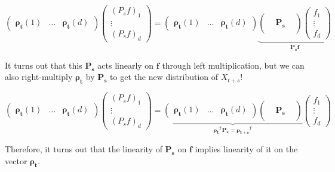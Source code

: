 \documentclass{article}
\begin{document}
\begin{example}
      \[\begin{pmatrix} \boldsymbol{\rho_t} (1) & \ldots & \boldsymbol{\rho_t} (d) \end{pmatrix} \begin{pmatrix} (P_s f)_1 \\ \vdots \\(P_s f)_d \end{pmatrix} = \begin{pmatrix} \boldsymbol{\rho_t} (1) & \ldots & \boldsymbol{\rho_t} (d) \end{pmatrix} \underbrace{\begin{pmatrix} && \\ & \mathbf{P_s} & \\ && \end{pmatrix} \begin{pmatrix} f_1 \\ \vdots \\ f_d \end{pmatrix}}_{\mathbf{P_s f}}\]

    It turns out that this $\mathbf{P_s}$ acts linearly on $\mathbf{f}$ through left multiplication, but we can also right-multiply $\boldsymbol{\rho_t}$ by $\mathbf{P_s}$ to get the new distribution of $X_{t + s}$! 

      \[\begin{pmatrix} \boldsymbol{\rho_t} (1) & \ldots & \boldsymbol{\rho_t} (d) \end{pmatrix} \begin{pmatrix} (P_s f)_1 \\ \vdots \\(P_s f)_d \end{pmatrix} = \underbrace{\begin{pmatrix} \boldsymbol{\rho_t} (1) & \ldots & \boldsymbol{\rho_t} (d) \end{pmatrix} \begin{pmatrix} && \\ & \mathbf{P_s} & \\ && \end{pmatrix}}_{\boldsymbol{\rho_t}^T \mathbf{P_s} = \boldsymbol{\rho_{t+s}}^T} \begin{pmatrix} f_1 \\ \vdots \\ f_d \end{pmatrix}\]

    Therefore, it turns out that the linearity of $\mathbf{P_s}$ on $\mathbf{f}$ implies linearity of it on the vector $\boldsymbol{\rho_t}$. 
  \end{example}
\end{document}
